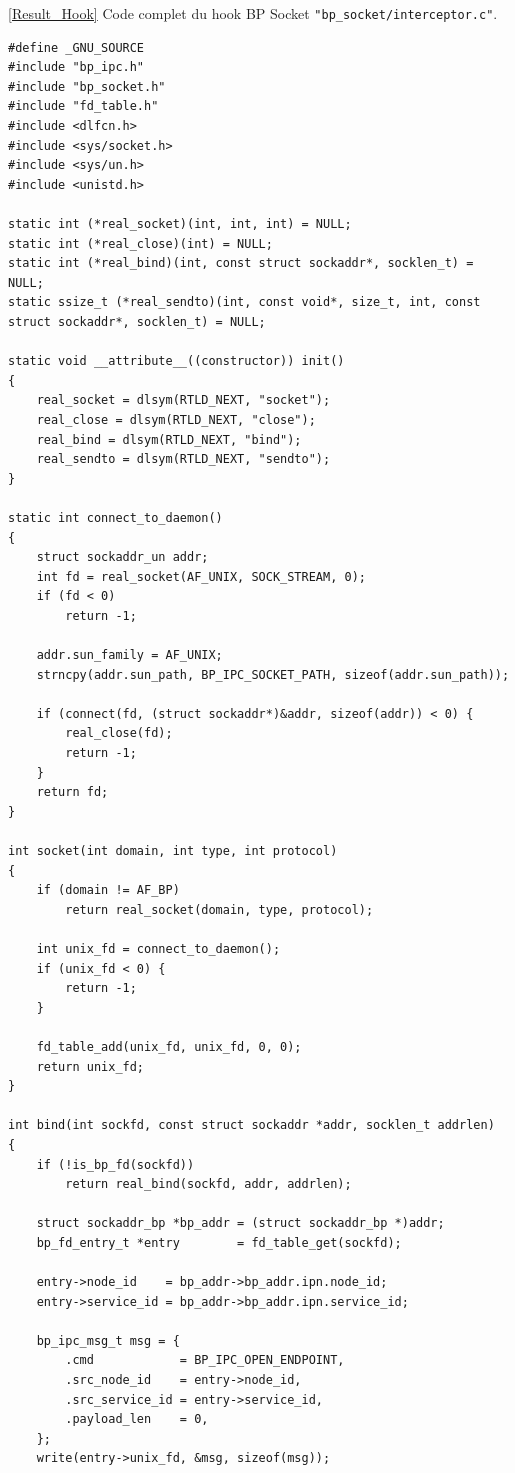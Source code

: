 \documentclass{article}
\begin{document}
\newpage
{}
\label{CodeHook}
\ref{Result_Hook}
Code complet du hook BP Socket \texttt{"bp\_socket/interceptor.c"}.
\begin{verbatim}
#define _GNU_SOURCE
#include "bp_ipc.h"
#include "bp_socket.h"
#include "fd_table.h"
#include <dlfcn.h>
#include <sys/socket.h>
#include <sys/un.h>
#include <unistd.h>

static int (*real_socket)(int, int, int) = NULL;
static int (*real_close)(int) = NULL;
static int (*real_bind)(int, const struct sockaddr*, socklen_t) = NULL;
static ssize_t (*real_sendto)(int, const void*, size_t, int, const struct sockaddr*, socklen_t) = NULL;

static void __attribute__((constructor)) init()
{
	real_socket = dlsym(RTLD_NEXT, "socket");
	real_close = dlsym(RTLD_NEXT, "close");
	real_bind = dlsym(RTLD_NEXT, "bind");
	real_sendto = dlsym(RTLD_NEXT, "sendto");
}

static int connect_to_daemon()
{
	struct sockaddr_un addr;
	int fd = real_socket(AF_UNIX, SOCK_STREAM, 0);
	if (fd < 0)
		return -1;

	addr.sun_family = AF_UNIX;
	strncpy(addr.sun_path, BP_IPC_SOCKET_PATH, sizeof(addr.sun_path));

	if (connect(fd, (struct sockaddr*)&addr, sizeof(addr)) < 0) {
		real_close(fd);
		return -1;
	}
	return fd;
}

int socket(int domain, int type, int protocol)
{
    if (domain != AF_BP)
        return real_socket(domain, type, protocol);

    int unix_fd = connect_to_daemon();
    if (unix_fd < 0) {
        return -1;
    }

    fd_table_add(unix_fd, unix_fd, 0, 0);
    return unix_fd;
}

int bind(int sockfd, const struct sockaddr *addr, socklen_t addrlen)
{
    if (!is_bp_fd(sockfd))
        return real_bind(sockfd, addr, addrlen);

    struct sockaddr_bp *bp_addr = (struct sockaddr_bp *)addr;
    bp_fd_entry_t *entry        = fd_table_get(sockfd);

    entry->node_id    = bp_addr->bp_addr.ipn.node_id;
    entry->service_id = bp_addr->bp_addr.ipn.service_id;

    bp_ipc_msg_t msg = {
        .cmd            = BP_IPC_OPEN_ENDPOINT,
        .src_node_id    = entry->node_id,
        .src_service_id = entry->service_id,
        .payload_len    = 0,
    };
    write(entry->unix_fd, &msg, sizeof(msg));


\end{verbatim}
\end{document}
